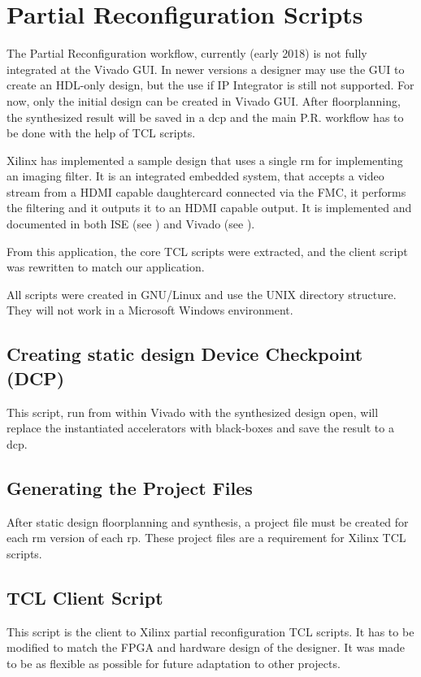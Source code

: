 \chapter{Partial Reconfiguration Scripts}

The Partial Reconfiguration workflow, currently (early 2018) is not fully integrated at the Vivado GUI.
In newer versions a designer may use the GUI to create an HDL-only design, but the use if IP Integrator
is still not supported. For now, only the initial design can be created in Vivado GUI.
After floorplanning, the synthesized result will be saved in a \gls{dcp} and the main P.R. workflow
has to be done with the help of TCL scripts. 

Xilinx has implemented a sample design that uses
a single \gls{rm} for implementing an imaging filter. It is an integrated embedded system,
that accepts a video stream from a HDMI capable daughtercard connected via the FMC,
it performs the filtering and it outputs it to an HDMI capable output. It is implemented and
documented in both ISE (see \cite{xapp1159}) and Vivado (see \cite{xapp1231}).

From this application, the core TCL scripts were extracted, and the client script
was rewritten to match our application.

All scripts were created in GNU/Linux and use the UNIX directory structure.
They will not work in a Microsoft Windows environment.

\section{Creating static design Device Checkpoint (DCP)}
This script, run from within Vivado with the synthesized design open, 
will replace the instantiated accelerators with black-boxes and save
the result to a \gls{dcp}.



\section{Generating the Project Files}
After static design floorplanning and synthesis, a project file must be
created for each \gls{rm} version of each \gls{rp}.
These project files are a requirement for Xilinx TCL scripts.



\section{TCL Client Script}
This script is the client to Xilinx partial reconfiguration TCL scripts.
It has to be modified to match the FPGA and hardware design of the designer.
It was made to be as flexible as possible for future adaptation to other projects.


